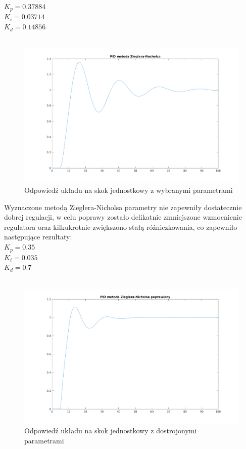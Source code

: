 \documentclass[a4paper, 11pt]{article}
\begin{document}
$K_p = 0.37884$\\
\indent$K_i = 0.03714$\\
\indent$K_d = 0.14856$\\
\\

\begin{figure}[H]
\centering
\includegraphics[scale=0.60]{2_1.png}
\caption{Odpowiedź układu na skok jednostkowy z wybranymi parametrami}
\end{figure}


\noindent Wyznaczone metodą Zieglera-Nicholsa parametry nie zapewniły dostatecznie dobrej regulacji, w celu poprawy zostało delikatnie zmniejszone wzmocnienie regulatora oraz kilkukrotnie zwiększono stałą różniczkowania, co zapewniło następujące rezultaty: \\

$K_p = 0.35$\\
\indent$K_i = 0.035$\\
\indent$K_d = 0.7$\\
\\

\begin{figure}[H]
\centering
\includegraphics[scale=0.60]{2_1_1.png}
\caption{Odpowiedź układu na skok jednostkowy z dostrojonymi parametrami}
\end{figure}
\end{document}
